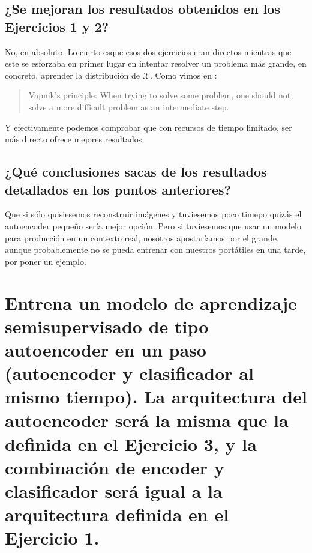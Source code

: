 \documentclass{article}
\begin{document}
\subsection{¿Se mejoran los resultados obtenidos en los Ejercicios 1 y 2?}
No, en absoluto. Lo cierto esque esos dos ejercicios eran directos mientras que este se esforzaba en primer lugar en intentar resolver un problema más grande, en concreto, aprender la distribución de $\mathcal{X}$. Como vimos en \cite{chapelle2006semi}:
\begin{quote}
Vapnik’s principle: When trying to solve some problem, one should not solve a more
diﬃcult problem as an intermediate step.
\end{quote}

Y efectivamente podemos comprobar que con recursos de tiempo limitado, ser más directo ofrece mejores resultados


\subsection{¿Qué conclusiones sacas de los resultados detallados en los puntos anteriores?}

Que si sólo quisiesemos reconstruir imágenes y tuviesemos poco timepo quizás el autoencoder pequeño sería mejor opción. Pero si tuviesemos que usar un modelo para producción en un contexto real, nosotros apostaríamos por el grande, aunque probablemente no se pueda entrenar con nuestros portátiles en una tarde, por poner un ejemplo.

\newpage
\section{Entrena un modelo de aprendizaje semisupervisado de tipo autoencoder en un paso (autoencoder y clasificador al mismo tiempo). La arquitectura del autoencoder será la misma que la definida en el Ejercicio 3, y la combinación de encoder y clasificador será igual a la arquitectura definida en el Ejercicio 1.}
\end{document}
